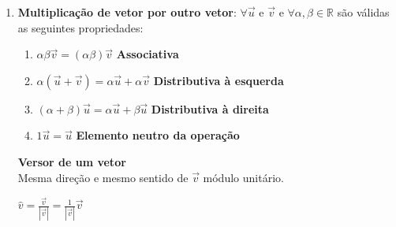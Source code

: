 \documentclass[12pt]{article}
\begin{document}
\begin{enumerate}
        \begin{center}
        \end{center}

        \item \textbf{Multiplicação de vetor por outro vetor}: $\forall \overrightarrow{u} \text{ e } \overrightarrow{v} \text{ e } \forall \alpha, \beta \in \mathbb{R}$ são válidas as seguintes propriedades:
        \begin{enumerate}[label=\alph*)]
            \item $\alpha \beta \overrightarrow{v} = (\alpha\beta)\overrightarrow{v}$                                           \hfill \textbf{Associativa}
            \item $\alpha (\overrightarrow{u} + \overrightarrow{v}) = \alpha\overrightarrow{u} + \alpha\overrightarrow{v}$      \hfill \textbf{Distributiva à esquerda}
            \item $(\alpha + \beta) \overrightarrow{u} = \alpha\overrightarrow{u} + \beta\overrightarrow{u}$                    \hfill \textbf{Distributiva à direita}
            \item $1\overrightarrow{u} = \overrightarrow{u}$                                                                    \hfill \textbf{Elemento neutro da operação}
        \end{enumerate}
        \textbf{Versor de um vetor} \\
        Mesma direção e mesmo sentido de $\overrightarrow{v}$ módulo unitário. \\
        
        \begin{center}
            $\hat{v} = \frac{\overrightarrow{v}}{|\overrightarrow{v}|} = \frac{1}{|\overrightarrow{v}|}\overrightarrow{v}$
        \end{center}
        
        \begin{center}
        \end{center}

\end{enumerate}
\end{document}
